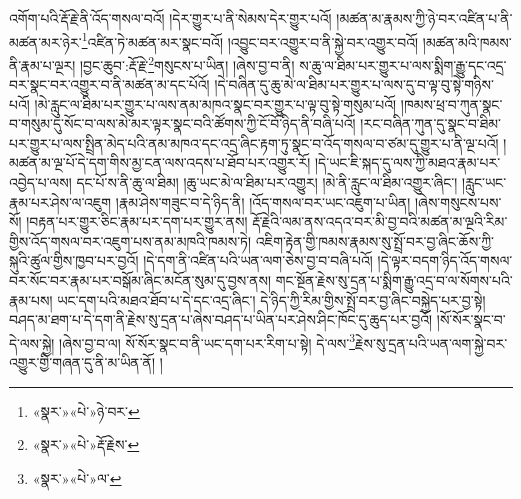 འགོག་པའི་རྡོ་རྗེ་ནི་འོད་གསལ་བའོ། །དེར་གྱུར་པ་ནི་སེམས་དེར་གྱུར་པའོ། །མཚན་མ་རྣམས་ཀྱི་ཉེ་བར་འཛིན་པ་ནི་མཚན་མར་ཉེར་\footnote{«སྣར་»«པེ་»ཉེ་བར་}འཛིན་ཏེ་མཚན་མར་སྣང་བའོ། །འབྱུང་བར་འགྱུར་བ་ནི་སྐྱེ་བར་འགྱུར་བའོ། །མཚན་མའི་ཁམས་ནི་རྣམ་པ་ལྔར། །བྱང་ཆུབ་:རྡོ་རྗེ་\footnote{«སྣར་»«པེ་»རྡོ་རྗེས་}གསུངས་པ་ཡིན། །ཞེས་བྱ་བ་ནི། ས་ཆུ་ལ་ཐིམ་པར་གྱུར་པ་ལས་སྨིག་རྒྱུ་དང་འདྲ་བར་སྣང་བར་འགྱུར་བ་ནི་མཚན་མ་དང་པོའོ། །དེ་བཞིན་དུ་ཆུ་མེ་ལ་ཐིམ་པར་གྱུར་པ་ལས་དུ་བ་ལྟ་བུ་སྟེ་གཉིས་པའོ། །མེ་རླུང་ལ་ཐིམ་པར་གྱུར་པ་ལས་ནམ་མཁའ་སྣང་བར་གྱུར་པ་ལྟ་བུ་སྟེ་གསུམ་པའོ། །ཁམས་ཕྲ་བ་ཀུན་སྣང་བ་གསུམ་དུ་སོང་བ་ལས་མེ་མར་ལྟར་སྣང་བའི་ཚོགས་ཀྱི་ངོ་བོ་ཉིད་ནི་བཞི་པའོ། །རང་བཞིན་ཀུན་དུ་སྣང་བ་ཐིམ་པར་གྱུར་པ་ལས་སྤྲིན་མེད་པའི་ནམ་མཁའ་དང་འདྲ་ཞིང་རྟག་ཏུ་སྣང་བ་འོད་གསལ་བ་ཙམ་དུ་གྱུར་པ་ནི་ལྔ་པའོ། །མཚན་མ་ལྔ་པོ་དེ་དག་གིས་མྱ་ངན་ལས་འདས་པ་ཐོབ་པར་འགྱུར་རོ། །དེ་ཡང་ཇི་སྐད་དུ་ལས་ཀྱི་མཐའ་རྣམ་པར་འབྱེད་པ་ལས། དང་པོ་ས་ནི་ཆུ་ལ་ཐིམ། །ཆུ་ཡང་མེ་ལ་ཐིམ་པར་འགྱུར། །མེ་ནི་རླུང་ལ་ཐིམ་འགྱུར་ཞིང་། །རླུང་ཡང་རྣམ་པར་ཤེས་ལ་འཇུག །རྣམ་ཤེས་གཟུང་བ་དེ་ཉིད་ནི། །འོད་གསལ་བར་ཡང་འཇུག་པ་ཡིན། །ཞེས་གསུངས་པས་སོ། །བརྟན་པར་གྱུར་ཅིང་རྣམ་པར་དག་པར་གྱུར་ནས། རྡོ་རྗེའི་ལམ་ནས་འདའ་བར་མི་བྱ་བའི་མཚན་མ་ལྔའི་རིམ་གྱིས་འོད་གསལ་བར་འཇུག་པས་ནམ་མཁའི་ཁམས་ཏེ། འཇིག་རྟེན་གྱི་ཁམས་རྣམས་སུ་སྤྲོ་བར་བྱ་ཞིང་ཆོས་ཀྱི་སྐུའི་ཚུལ་གྱིས་ཁྱབ་པར་བྱའོ། །དེ་དག་ནི་འཛིན་པའི་ཡན་ལག་ཅེས་བྱ་བ་བཞི་པའོ། །དེ་ལྟར་བདག་ཉིད་འོད་གསལ་བར་སོང་བར་རྣམ་པར་བསྒོམ་ཞིང་མངོན་སུམ་དུ་བྱས་ནས། གང་སྔོན་རྗེས་སུ་དྲན་པ་སྨིག་རྒྱུ་འདྲ་བ་ལ་སོགས་པའི་རྣམ་པས། ཡང་དག་པའི་མཐའ་ཐོབ་པ་དེ་དང་འདྲ་ཞིང་། དེ་ཉིད་ཀྱི་རིམ་གྱིས་སྤྲོ་བར་བྱ་ཞིང་བསྐྱེད་པར་བྱ་སྟེ། བཤད་མ་ཐག་པ་དེ་དག་ནི་རྗེས་སུ་དྲན་པ་ཞེས་བཤད་པ་ཡིན་པར་ཤེས་ཤིང་ཁོང་དུ་ཆུད་པར་བྱའོ། །སོ་སོར་སྣང་བ་དེ་ལས་སྐྱེ། །ཞེས་བྱ་བ་ལ། སོ་སོར་སྣང་བ་ནི་ཡང་དག་པར་རིག་པ་སྟེ། དེ་ལས་\footnote{«སྣར་»«པེ་»ལ་}རྗེས་སུ་དྲན་པའི་ཡན་ལག་སྐྱེ་བར་འགྱུར་གྱི་གཞན་དུ་ནི་མ་ཡིན་ནོ། །
